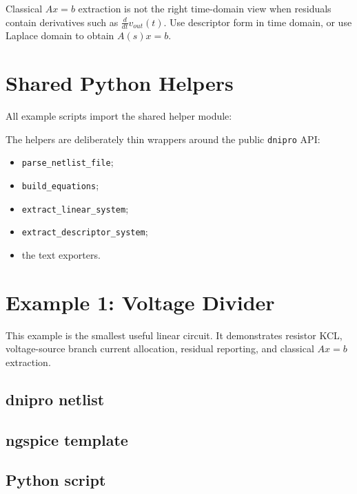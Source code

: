 \documentclass[11pt,a4paper]{article}
\newcommand{\project}{\texttt{dnipro}}
\newcommand{\code}[1]{\texttt{#1}}
\begin{document}
Classical \(A x=b\) extraction is not the right time-domain view when residuals
contain derivatives such as \(\frac{d}{dt}v_{out}(t)\). Use descriptor form in
time domain, or use Laplace domain to obtain \(A(s)x=b\).

\section{Shared Python Helpers}

All example scripts import the shared helper module:



The helpers are deliberately thin wrappers around the public \project{} API:

\begin{itemize}[noitemsep]
    \item \code{parse\_netlist\_file};
    \item \code{build\_equations};
    \item \code{extract\_linear\_system};
    \item \code{extract\_descriptor\_system};
    \item the text exporters.
\end{itemize}

\section{Example 1: Voltage Divider}
\label{sec:ex-voltage-divider}

This example is the smallest useful linear circuit. It demonstrates resistor
KCL, voltage-source branch current allocation, residual reporting, and
classical \(A x=b\) extraction.

\subsection{dnipro netlist}



\subsection{ngspice template}



\subsection{Python script}
\end{document}
